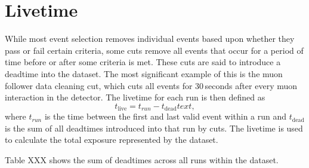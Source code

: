 \section{Livetime}
While most event selection removes individual events based upon whether they
pass or fail certain criteria, some cuts remove all events that occur for a
period of time before or after some criteria is met.
These cuts are said to introduce a deadtime into the dataset.
The most significant example of this is the muon follower data cleaning cut, which
cuts all events for 30\,seconds after every muon interaction in the detector.
The livetime for each run is then defined as
\begin{equation}
    t_{\mathrm{live}} = t_{run} - t_{\mathrm{dead}}text{,}
\end{equation}
where $t_{run}$ is the time between the first and last valid event within a run
and $t_{\mathrm{dead}}$ is the sum of all deadtimes introduced into that run by cuts.
The livetime is used to calculate the total exposure represented by the dataset.

Table XXX shows the sum of deadtimes across all runs within the dataset.
